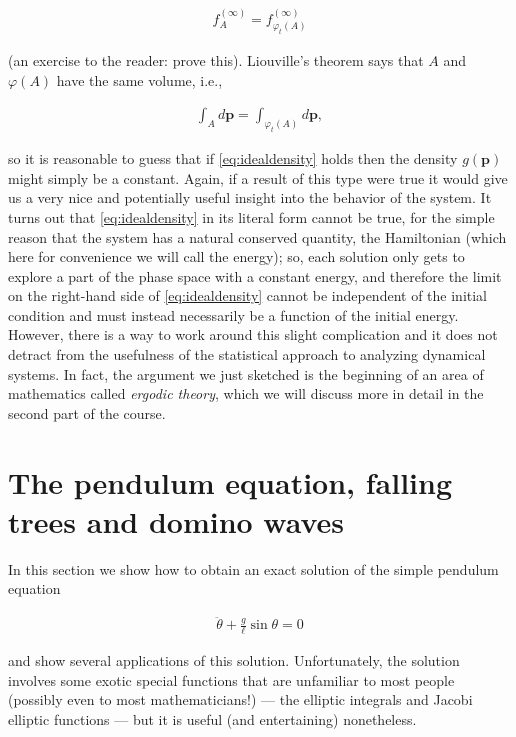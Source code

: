 \documentclass[11pt]{report}
\theoremstyle{plain}
\theoremstyle{definition}
\begin{document}
\begin{align*}
f_A^{(\infty)} = f_{\varphi_t(A)}^{(\infty)}
\end{align*}

\noindent (an exercise to the reader: prove this). Liouville's
theorem says that $A$ and $\varphi(A)$ have the same
volume, i.e.,

\begin{align*}
\int_A d\mathbf{p} = \int_{\varphi_t(A)} d\mathbf{p},
\end{align*}

\noindent so it is reasonable to guess that if
\eqref{eq:idealdensity} holds then the density
$g(\mathbf{p})$ might simply be a constant. Again, if
a result of this type were true it would give us a
very nice and potentially useful insight into the
behavior of the system. It turns out that
\eqref{eq:idealdensity} in its literal form cannot be
true, for the simple reason that the system has a
natural conserved quantity, the Hamiltonian (which
here for convenience we will call the energy); so,
each solution only gets to explore a part of the phase
space with a constant energy, and therefore the limit
on the right-hand side of \eqref{eq:idealdensity} cannot
be independent of the initial condition and must
instead necessarily be a function of the initial
energy. However, there is a way to work around this
slight complication and it does not detract from the
usefulness of the statistical approach to analyzing
dynamical systems. In fact, the argument we just
sketched is the beginning of an area of mathematics
called \emph{ergodic theory}, which we will discuss more in
detail in the second part of the course.

\section{The pendulum equation, falling trees and domino waves}

In this section we show how to obtain an exact
solution of the simple pendulum equation

\begin{align*}
\ddot{\theta} + \frac{g}{\ell} \sin \theta = 0
\end{align*}

\noindent and show several applications of this solution.
Unfortunately, the solution involves some exotic
special functions that are unfamiliar to most people
(possibly even to most mathematicians!) --- the
elliptic integrals and Jacobi elliptic functions ---
but it is useful (and entertaining) nonetheless.
\end{document}

